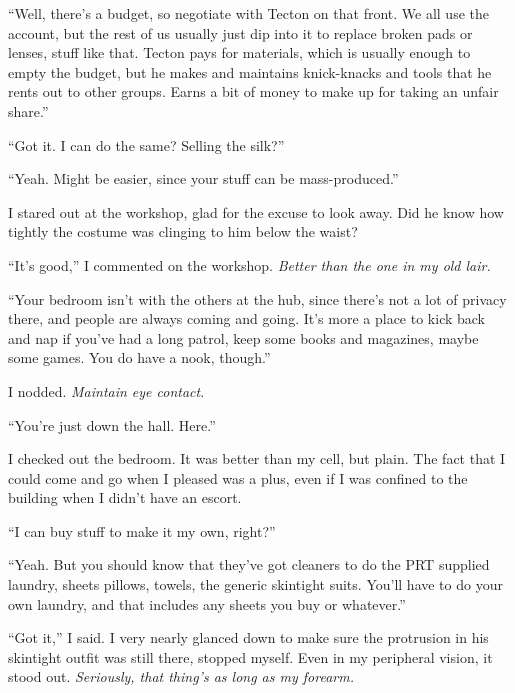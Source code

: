 ``Well, there's a budget, so negotiate with Tecton on that front.  We all use the account, but the rest of us usually just dip into it to replace broken pads or lenses, stuff like that.  Tecton pays for materials, which is usually enough to empty the budget, but he makes and maintains knick-knacks and tools that he rents out to other groups.  Earns a bit of money to make up for taking an unfair share.''



``Got it.  I can do the same?  Selling the silk?''



``Yeah.  Might be easier, since your stuff can be mass-produced.''



I stared out at the workshop, glad for the excuse to look away.  Did he know how tightly the costume was clinging to him below the waist?



``It's good,'' I commented on the workshop.  \emph{Better than the one in my old lair.}



``Your bedroom isn't with the others at the hub, since there's not a lot of privacy there, and people are always coming and going.  It's more a place to kick back and nap if you've had a long patrol, keep some books and magazines, maybe some games.  You do have a nook, though.''



I nodded.  \emph{Maintain eye contact}.



``You're just down the hall.  Here.''



I checked out the bedroom.  It was better than my cell, but plain.  The fact that I could come and go when I pleased was a plus, even if I was confined to the building when I didn't have an escort.



``I can buy stuff to make it my own, right?''



``Yeah.  But you should know that they've got cleaners to do the PRT supplied laundry, sheets pillows, towels, the generic skintight suits.  You'll have to do your own laundry, and that includes any sheets you buy or whatever.''



``Got it,'' I said.  I very nearly glanced down to make sure the protrusion in his skintight outfit was still there, stopped myself.  Even in my peripheral vision, it stood out.  \emph{Seriously, that thing's as long as my forearm.}



